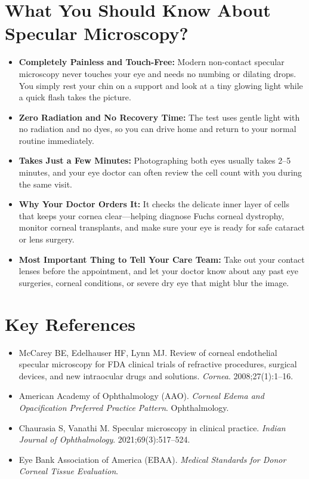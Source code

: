 \section{What You Should Know About Specular Microscopy?}

\begin{itemize}
    \item \textbf{Completely Painless and Touch-Free:} Modern non-contact specular microscopy never touches your eye and needs no numbing or dilating drops. You simply rest your chin on a support and look at a tiny glowing light while a quick flash takes the picture.
    \item \textbf{Zero Radiation and No Recovery Time:} The test uses gentle light with no radiation and no dyes, so you can drive home and return to your normal routine immediately.
    \item \textbf{Takes Just a Few Minutes:} Photographing both eyes usually takes 2--5 minutes, and your eye doctor can often review the cell count with you during the same visit.
    \item \textbf{Why Your Doctor Orders It:} It checks the delicate inner layer of cells that keeps your cornea clear---helping diagnose Fuchs corneal dystrophy, monitor corneal transplants, and make sure your eye is ready for safe cataract or lens surgery.
    \item \textbf{Most Important Thing to Tell Your Care Team:} Take out your contact lenses before the appointment, and let your doctor know about any past eye surgeries, corneal conditions, or severe dry eye that might blur the image.
\end{itemize}

\section{Key References}

\begin{itemize}
    \item McCarey BE, Edelhauser HF, Lynn MJ. Review of corneal endothelial specular microscopy for FDA clinical trials of refractive procedures, surgical devices, and new intraocular drugs and solutions. \textit{Cornea}. 2008;27(1):1--16.
    \item American Academy of Ophthalmology (AAO). \textit{Corneal Edema and Opacification Preferred Practice Pattern}. Ophthalmology.
    \item Chaurasia S, Vanathi M. Specular microscopy in clinical practice. \textit{Indian Journal of Ophthalmology}. 2021;69(3):517--524.
    \item Eye Bank Association of America (EBAA). \textit{Medical Standards for Donor Corneal Tissue Evaluation}.
\end{itemize}
